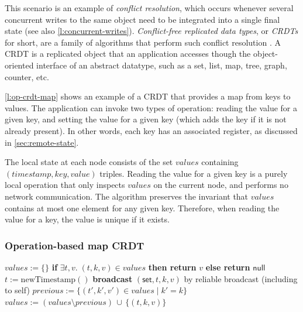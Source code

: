 This scenario is an example of \emph{conflict resolution}, which occurs whenever several concurrent writes to the same object need to be integrated into a single final state (see also \autoref{l:concurrent-writes}).
\emph{Conflict-free replicated data types}, or \emph{CRDTs} for short, are a family of algorithms that perform such conflict resolution \citep{Shapiro:2011}.
A CRDT is a replicated object that an application accesses though the object-oriented interface of an abstract datatype, such as a set, list, map, tree, graph, counter, etc.

\autoref{l:op-crdt-map} shows an example of a CRDT that provides a map from keys to values.
The application can invoke two types of operation: reading the value for a given key, and setting the value for a given key (which adds the key if it is not already present).
In other words, each key has an associated register, as discussed in \autoref{sec:remote-state}.

The local state at each node consists of the set $\mathit{values}$ containing $(\mathit{timestamp}, \mathit{key}, \mathit{value})$ triples.
Reading the value for a given key is a purely local operation that only inspects $\mathit{values}$ on the current node, and performs no network communication.
The algorithm preserves the invariant that $\mathit{values}$ contains at most one element for any given key.
Therefore, when reading the value for a key, the value is unique if it exists.

\begin{frame}
    \label{s:op-crdt-map}
    \frametitle{Operation-based map CRDT}
    \footnotesize
    \begin{algorithmic}
            \State $\mathit{values} := \{\}$
        \EndOn
        \State
            \State \textbf{if} $\exists t,v.\; (t,k,v) \in \mathit{values}$ \textbf{then return} $v$ \textbf{else return} $\mathsf{null}$
        \EndOn
        \State
            \State $t := \mathrm{newTimestamp}()$ 
            \State \textbf{broadcast} $(\mathsf{set}, t, k, v)$ by reliable broadcast (including to self)
        \EndOn
        \State
            \State $\mathit{previous} := \{(t',k',v') \in \mathit{values} \mid k' = k\}$
                \State $\mathit{values} := (\mathit{values} \setminus \mathit{previous}) \,\cup\, \{(t,k,v)\}$
            \EndIf
        \EndOn
    \end{algorithmic}
\end{frame}
\label{l:op-crdt-map}

